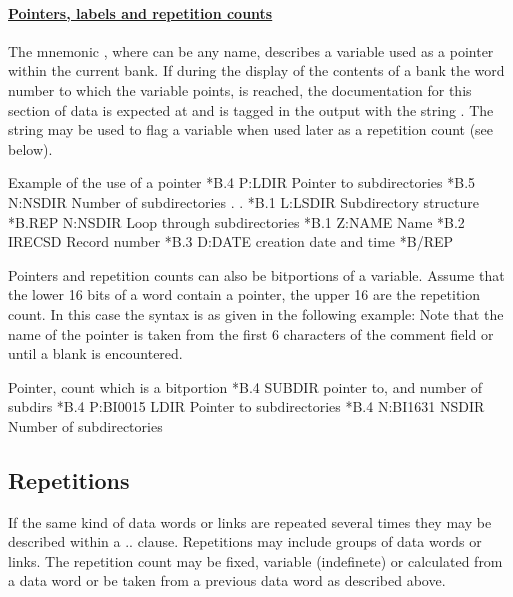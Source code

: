 \paragraph{\underline{\bf Pointers, labels and repetition counts}}
\label{pointer (bank documentation)}
\label{repetition (bank documentation)}
 
The mnemonic , where  can be any name,
describes a variable used as a pointer within the current bank. 
If during the display of 
the contents of a bank the word number to which the variable points, 
is reached, the documentation for this section of data is expected
at  and is tagged in the output with the string .
The string  may be used to flag a variable when 
used later as a repetition count (see below).
 
\begin{XMPt}{Example of the use of a pointer}
*B.4      P:LDIR     Pointer to subdirectories
*B.5      N:NSDIR    Number of subdirectories
.
.
*B.1      L:LSDIR    Subdirectory structure
*B.REP    N:NSDIR    Loop through subdirectories
*B.1      Z:NAME     Name
*B.2      IRECSD     Record number
*B.3      D:DATE     creation date and time
*B/REP
\end{XMPt}
 
Pointers and repetition counts can also be bitportions of a variable.
Assume that the lower 16 bits of a word contain a pointer, the upper
16 are the repetition count.
In this case the syntax is as given in the following example:
Note that the name of the pointer  is taken from the first 6 characters
of the comment field or until a blank is encountered.
 
\begin{XMPt}{Pointer, count which is a bitportion}
*B.4      SUBDIR     pointer to, and number of subdirs
*B.4      P:BI0015   LDIR     Pointer to subdirectories
*B.4      N:BI1631   NSDIR    Number of subdirectories
\end{XMPt}
 
 
\subsection{Repetitions}
If the same kind of data words or links are repeated several times
they may be described within a  ..  clause. 
Repetitions may include groups of data words or links. 
The repetition count may be fixed, variable
(indefinete) or calculated from a data word or be taken from a previous
data word as described above.
 
